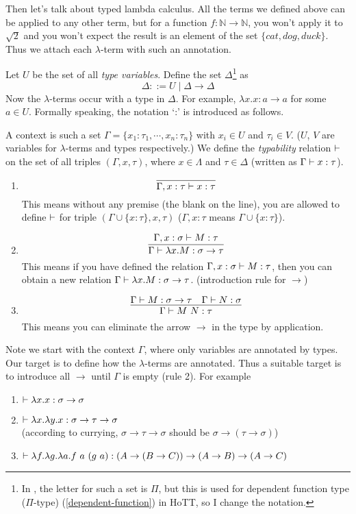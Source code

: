 Then let's talk about typed lambda calculus. All the terms we defined
above can be applied to any other term, but for a function 
$f: \mathbb{N}\to\mathbb{N}$, you won't apply it to $\sqrt 2$ and 
you won't expect the result is an element of the set $\{cat,dog,duck\}$.
Thus we attach each $\lambda$-term with such an annotation. 

Let $U$ be the set of all {\it type variables}. Define the set 
$\Delta$\footnote{In \cite{Curry-Howard}, the letter for such a set is
$\Pi$, but this is used for dependent function type ($\Pi$-type) 
(\autoref{dependent-function}) in HoTT, so I change the notation.} as
$$
    \Delta ::= U \mid \Delta \to \Delta
$$
Now the $\lambda$-terms occur with a type in $\Delta$. For example,
$\lambda x. x: a\to a$ for some $a\in U$. Formally speaking, the
notation `:' is introduced as follows. 

A context is such a set $\Gamma = \{x_1: \tau_1, \cdots, x_n:\tau_n\}$ 
with $x_i\in U$ and $\tau_i\in V$. ($U$, $V$ are variables for 
$\lambda$-terms and types respectively.) We define the {\it typability}
relation $\vdash$ on the set of all triples $(\Gamma, x, \tau)$, where 
$x\in\Lambda$ and $\tau\in\Delta$ (written as $\Gamma\vdash x:\tau$).

\begin{enumerate}
    \item $$\infer{\Gamma, x:\tau\proves x:\tau}{}$$
    This means without any premise (the blank on the line), you
    are allowed to define $\vdash$ for triple 
    $(\Gamma\cup\{x:\tau\}, x, \tau)$
    ($\Gamma,x:\tau$ means $\Gamma\cup\{x:\tau\}$).
    \item $$\infer{\Gamma\proves\lambda x.M:\sigma\to\tau}{\Gamma,x:\sigma\proves M:\tau}$$
    This means if you have defined the relation $\Gamma,x:\sigma\vdash M:\tau$,
    then you can obtain a new relation $\Gamma\vdash\lambda x.M:\sigma\to\tau$.
    (introduction rule for $\to$)
    \item $$\infer{\Gamma\proves M\ N:\tau}{\Gamma\proves M:\sigma\to\tau & \Gamma\proves N:\sigma}$$
    This means you can eliminate the arrow $\to$ in the type by application.
\end{enumerate}

Note we start with the context $\Gamma$, where only variables are annotated
by types. Our target is to define how the $\lambda$-terms are annotated.
Thus a suitable target is to introduce all $\to$ until $\Gamma$ is empty
(rule 2). For example
\begin{enumerate}
    \item $\vdash \lambda x.x: \sigma\to\sigma$
    \item $\vdash \lambda x.\lambda y.x: \sigma\to\tau\to\sigma$ \\
    (according to currying, $\sigma\to\tau\to\sigma$ should be 
    $\sigma\to(\tau\to\sigma)$)
    \item $\vdash \lambda f.\lambda g.\lambda a. f\ a\ (g\ a):
    (A\to(B\to C))\to(A\to B)\to(A\to C)$
\end{enumerate}

